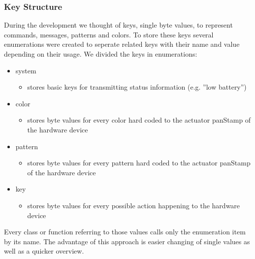 \subsubsection{Key Structure}
During the development we thought of keys, single byte values, to represent commands, messages, patterns and colors. To store these keys several enumerations were created to seperate related keys with their name and value depending on their usage.
We divided the keys in enumerations:
\begin{itemize}
    \item system
    \begin{itemize}
         \item stores basic keys for transmitting status information (e.g. ''low battery'')
    \end{itemize}
    \item color
    \begin{itemize}
        \item stores byte values for every color hard coded to the actuator panStamp of the hardware device
    \end{itemize}
    \item pattern
    \begin{itemize}
        \item stores byte values for every pattern hard coded to the actuator panStamp of the hardware device
    \end{itemize}
    \item key
    \begin{itemize}
        \item stores byte values for every possible action happening to the hardware device
    \end{itemize}
\end{itemize} 

Every class or function referring to those values calls only the enumeration item by its name. The advantage of this approach is easier changing of single values as well as a quicker overview.

